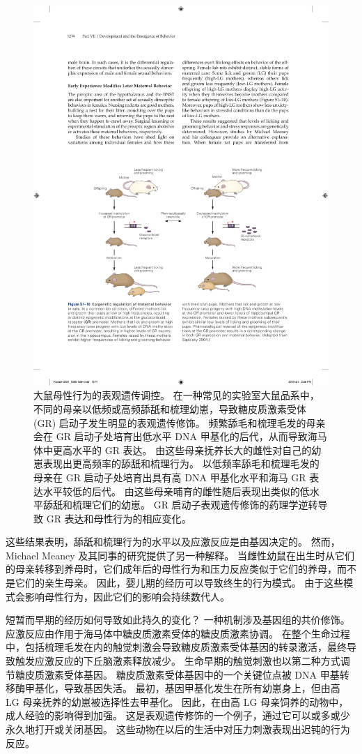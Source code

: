 \begin{figure}[htbp]
	\centering
	\includegraphics[width=0.7\linewidth]{chap51/fig_51_10}
	\caption{大鼠母性行为的表观遗传调控。
		在一种常见的实验室大鼠品系中，不同的母亲以低频或高频舔舐和梳理幼崽，导致糖皮质激素受体 (GR) 启动子发生明显的表观遗传修饰。
		频繁舔毛和梳理毛发的母亲会在 GR 启动子处培育出低水平 DNA 甲基化的后代，从而导致海马体中更高水平的 GR 表达。
		由这些母亲抚养长大的雌性对自己的幼崽表现出更高频率的舔舐和梳理行为。
		以低频率舔毛和梳理毛发的母亲在 GR 启动子处培育出具有高 DNA 甲基化水平和海马 GR 表达水平较低的后代。
		由这些母亲哺育的雌性随后表现出类似的低水平舔舐和梳理它们的幼崽。
		GR 启动子表观遗传修饰的药理学逆转导致 GR 表达和母性行为的相应变化\cite{sapolsky2004mothering}。}
	\label{fig:51_10}
\end{figure}


这些结果表明，舔舐和梳理行为的水平以及应激反应是由基因决定的。
然而，Michael Meaney 及其同事的研究提供了另一种解释。
当雌性幼鼠在出生时从它们的母亲转移到养母时，它们成年后的母性行为和压力反应类似于它们的养母，而不是它们的亲生母亲。
因此，婴儿期的经历可以导致终生的行为模式。
由于这些模式会影响母性行为，因此它们的影响会持续数代人。


短暂而早期的经历如何导致如此持久的变化？
一种机制涉及基因组的共价修饰。
应激反应由作用于海马体中糖皮质激素受体的糖皮质激素协调。
在整个生命过程中，包括梳理毛发在内的触觉刺激会导致糖皮质激素受体基因的转录激活，最终导致触发应激反应的下丘脑激素释放减少。
生命早期的触觉刺激也以第二种方式调节糖皮质激素受体基因。
糖皮质激素受体基因中的一个关键位点被 DNA 甲基转移酶甲基化，导致基因失活。
最初，基因甲基化发生在所有幼崽身上，但由高 LG 母亲抚养的幼崽被选择性去甲基化。
因此，在由高 LG 母亲饲养的动物中，成人经验的影响得到加强。
这是表观遗传修饰的一个例子，通过它可以或多或少永久地打开或关闭基因。
这些动物在以后的生活中对压力刺激表现出迟钝的行为反应。


